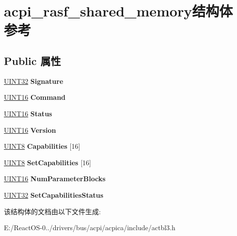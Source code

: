 \hypertarget{structacpi__rasf__shared__memory}{}\section{acpi\+\_\+rasf\+\_\+shared\+\_\+memory结构体 参考}
\label{structacpi__rasf__shared__memory}
\subsection*{Public 属性}
\begin{DoxyCompactItemize}
\item 
\mbox{\label{structacpi__rasf__shared__memory_a3654b3a04bb477d2e2ee74750d2d65fb}} 
\hyperlink{_processor_bind_8h_ae1e6edbbc26d6fbc71a90190d0266018}{U\+I\+N\+T32} {\bfseries Signature}
\item 
\mbox{\label{structacpi__rasf__shared__memory_a84d35c0c5d64e34c2bb4c5268d759e0a}} 
\hyperlink{_processor_bind_8h_a09f1a1fb2293e33483cc8d44aefb1eb1}{U\+I\+N\+T16} {\bfseries Command}
\item 
\mbox{\label{structacpi__rasf__shared__memory_a2303092571139ecefd934adf5fbd895a}} 
\hyperlink{_processor_bind_8h_a09f1a1fb2293e33483cc8d44aefb1eb1}{U\+I\+N\+T16} {\bfseries Status}
\item 
\mbox{\label{structacpi__rasf__shared__memory_a4ae4d0f9fa89c4e2101620adb86eafed}} 
\hyperlink{_processor_bind_8h_a09f1a1fb2293e33483cc8d44aefb1eb1}{U\+I\+N\+T16} {\bfseries Version}
\item 
\mbox{\label{structacpi__rasf__shared__memory_a6cf467d4d9e1654ce910a663bd53cd5d}} 
\hyperlink{_processor_bind_8h_ab27e9918b538ce9d8ca692479b375b6a}{U\+I\+N\+T8} {\bfseries Capabilities} \mbox{[}16\mbox{]}
\item 
\mbox{\label{structacpi__rasf__shared__memory_a61b1a0660f7ce24959fe8c08ec3fece5}} 
\hyperlink{_processor_bind_8h_ab27e9918b538ce9d8ca692479b375b6a}{U\+I\+N\+T8} {\bfseries Set\+Capabilities} \mbox{[}16\mbox{]}
\item 
\mbox{\label{structacpi__rasf__shared__memory_a2a18678250542d45ed1453331ece8b99}} 
\hyperlink{_processor_bind_8h_a09f1a1fb2293e33483cc8d44aefb1eb1}{U\+I\+N\+T16} {\bfseries Num\+Parameter\+Blocks}
\item 
\mbox{\label{structacpi__rasf__shared__memory_ac8778572a1f2d0fac2ce036c06d2ee57}} 
\hyperlink{_processor_bind_8h_ae1e6edbbc26d6fbc71a90190d0266018}{U\+I\+N\+T32} {\bfseries Set\+Capabilities\+Status}
\end{DoxyCompactItemize}


该结构体的文档由以下文件生成\+:\begin{DoxyCompactItemize}
\item 
E\+:/\+React\+O\+S-\/0../drivers/bus/acpi/acpica/include/actbl3.\+h\end{DoxyCompactItemize}
